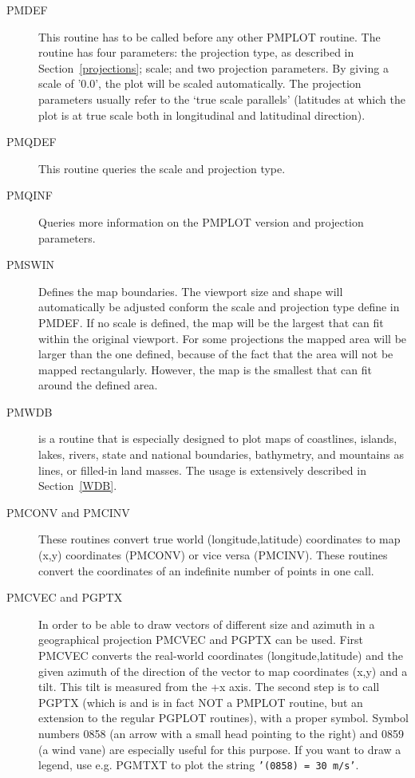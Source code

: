 \documentclass[titlepage,a4paper]{article}
\begin{document}
\begin{description}
\item[PMDEF]
This routine has to be called before any other PMPLOT routine. The
routine has four parameters: the projection type, as described in
Section~\ref{projections}; scale; and two projection parameters.
By giving a scale of '0.0', the plot will be scaled automatically.
The projection parameters usually refer to the `true scale parallels'
(latitudes at which the plot is at true scale both in longitudinal and
latitudinal direction).

\item[PMQDEF]
This routine queries the scale and projection type.

\item[PMQINF]
Queries more information on the PMPLOT version and projection parameters.

\item[PMSWIN]
Defines the map boundaries. The viewport size and shape will
automatically be adjusted conform the scale and projection type define in
PMDEF. If no scale is defined, the map will be the largest that can fit
within the original viewport. For some projections the mapped area will
be larger than the one defined, because of the fact that the area will not
be mapped rectangularly. However, the map is the smallest that can fit
around the defined area.

\item[PMWDB]
is a routine that is especially designed to plot maps of coastlines,
islands, lakes, rivers, state and national boundaries, bathymetry, and
mountains as lines, or filled-in land masses.
The usage is extensively described in Section~\ref{WDB}.

\item[PMCONV and PMCINV]
These routines convert true world (longitude,latitude) coordinates to map
(x,y) coordinates (PMCONV) or vice versa (PMCINV). These routines convert the
coordinates of an indefinite number of points in one call.

\item[PMCVEC and PGPTX]
In order to be able to draw vectors of different size and azimuth in a
geographical projection PMCVEC and PGPTX can be used.
First PMCVEC converts the real-world coordinates (longitude,latitude) and
the given azimuth of the direction of the vector to map coordinates (x,y)
and a tilt. This tilt is measured from the +x axis. The second step is to
call PGPTX (which is and is in fact NOT a PMPLOT routine, but an extension to
the regular PGPLOT routines), with a proper symbol. Symbol numbers 0858 (an
arrow with a small head pointing to the right) and 0859 (a wind vane) are
especially useful for this purpose. If you want to draw a legend, use e.g.
PGMTXT to plot the string {\tt'\bs(0858) = 30 m/s'}.


\end{description}
\end{document}
